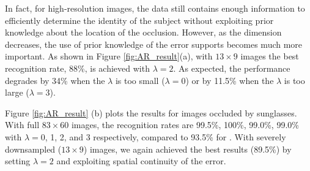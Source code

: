 In fact, for high-resolution images, the data still contains enough information to efficiently
determine the identity of the subject without exploiting prior knowledge about the location of the occlusion.
However, as the dimension decreases, the use of
prior knowledge of the error supports becomes much more important. As
shown in Figure \ref{fig:AR_result}(a), with $13\times 9$ images
the best recognition rate, 88\%, is achieved with $\lambda=2$.
As expected, the performance degrades by 34\% when the $\lambda$ is
too small ($\lambda=0$) or by 11.5\% when the $\lambda$ is too large
($\lambda=3$).

Figure \ref{fig:AR_result} (b) plots the results for images occluded by sunglasses.
With full $83 \times 60$ images, the recognition
rates are 99.5\%, 100\%, 99.0\%, 99.0\% with $\lambda=$0, 1, 2, and
3 respectively, compared to 93.5\% for \cite{Wright2009-PAMI}.
With severely downsampled ($13 \times 9$) images, we again achieved
the best results (89.5\%) by setting $\lambda=2$ and exploiting spatial continuity of the error.\vspace{0mm}


